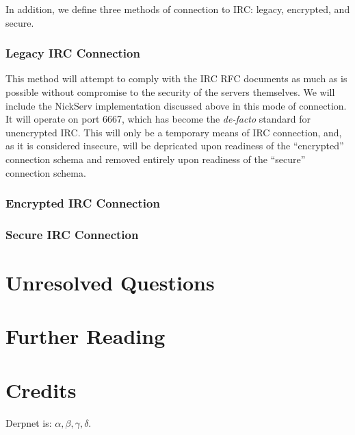 \documentclass[11pt]{article}
\begin{document}
In addition, we define three methods of connection to IRC: legacy, encrypted,
and secure.

\subsubsection{Legacy IRC Connection}

This method will attempt to comply with the IRC RFC documents as much as is
possible without compromise to the security of the servers themselves.  We
will include the NickServ implementation discussed above in this mode of
connection.  It will operate on port 6667, which has become the
\textit{de-facto} standard for unencrypted IRC.  This will only be a temporary
means of IRC connection, and, as it is considered insecure, will be depricated
upon readiness of the ``encrypted'' connection schema and removed entirely
upon readiness of the ``secure'' connection schema.

\subsubsection{Encrypted IRC Connection}

\subsubsection{Secure IRC Connection}

\section{Unresolved Questions}

\section{Further Reading}

\section{Credits}

Derpnet is: $\alpha, \beta, \gamma, \delta$.
\end{document}
